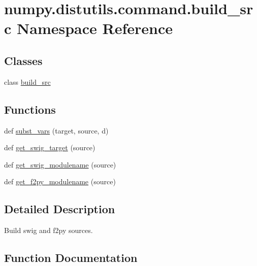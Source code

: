\hypertarget{namespacenumpy_1_1distutils_1_1command_1_1build__src}{}\section{numpy.\+distutils.\+command.\+build\+\_\+src Namespace Reference}
\label{namespacenumpy_1_1distutils_1_1command_1_1build__src}
\subsection*{Classes}
\begin{DoxyCompactItemize}
\item 
class \hyperlink{classnumpy_1_1distutils_1_1command_1_1build__src_1_1build__src}{build\+\_\+src}
\end{DoxyCompactItemize}
\subsection*{Functions}
\begin{DoxyCompactItemize}
\item 
def \hyperlink{namespacenumpy_1_1distutils_1_1command_1_1build__src_a49a36b2e7c17fc9ca13a4d3093890804}{subst\+\_\+vars} (target, source, d)
\item 
def \hyperlink{namespacenumpy_1_1distutils_1_1command_1_1build__src_a9cc50790aa1fd09cdc75d7855d6c0f17}{get\+\_\+swig\+\_\+target} (source)
\item 
def \hyperlink{namespacenumpy_1_1distutils_1_1command_1_1build__src_af885fc96b790b8deaaecd8ac69e17f5b}{get\+\_\+swig\+\_\+modulename} (source)
\item 
def \hyperlink{namespacenumpy_1_1distutils_1_1command_1_1build__src_a3634d69968f7681bcafa57a838c925ac}{get\+\_\+f2py\+\_\+modulename} (source)
\end{DoxyCompactItemize}


\subsection{Detailed Description}
\begin{DoxyVerb}Build swig and f2py sources.
\end{DoxyVerb}
 

\subsection{Function Documentation}
\mbox{\label{namespacenumpy_1_1distutils_1_1command_1_1build__src_a3634d69968f7681bcafa57a838c925ac}} 

